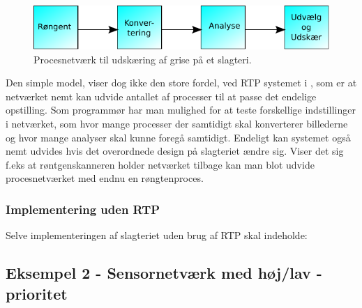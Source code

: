 \begin{figure}
 \begin{center}
  \includegraphics[scale=1]{images/pig-network}
	\caption{Procesnetværk til udskæring af grise på et slagteri.}
	\label{fig:pig-network}
\end{center}
\end{figure}

Den simple model, viser dog ikke den store fordel, ved RTP systemet i \pycsp, som er at netværket nemt kan udvide antallet af processer til at passe det endelige opstilling. Som programmør har man mulighed for at teste forskellige indstillinger i netværket, som hvor mange processer der samtidigt skal konverterer billederne og hvor mange analyser skal kunne foregå samtidigt. Endeligt kan systemet også nemt udvides hvis det overordnede design på slagteriet ændre sig. Viser det sig f.eks at røntgenskanneren holder netværket tilbage kan man blot udvide procesnetværket med endnu en røngtenproces.

\subsubsection*{Implementering uden RTP}
Selve implementeringen af slagteriet uden brug af RTP skal indeholde: 



\subsection{Eksempel 2 - Sensornetværk med høj/lav -prioritet}
